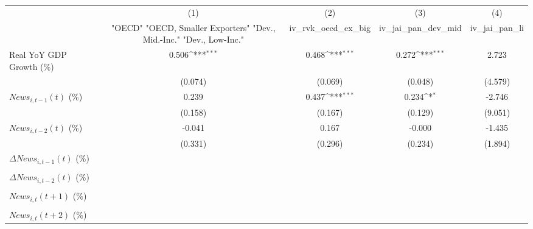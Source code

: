 {
\def\sym#1{\ifmmode^{#1}\else\(^{#1}\)\fi}
\begin{tabular}{l*{4}{c}}
\toprule
                    &\multicolumn{1}{c}{(1)}&\multicolumn{1}{c}{(2)}&\multicolumn{1}{c}{(3)}&\multicolumn{1}{c}{(4)}\\
                    &\multicolumn{1}{c}{ "OECD" "OECD, Smaller Exporters" "Dev., Mid.-Inc." "Dev., Low-Inc."}&\multicolumn{1}{c}{iv_rvk_oecd_ex_big}&\multicolumn{1}{c}{iv_jai_pan_dev_mid}&\multicolumn{1}{c}{iv_jai_pan_li}\\
\midrule
Real YoY GDP Growth (\%)&       0.506\sym{***}&       0.468\sym{***}&       0.272\sym{***}&       2.723         \\
                    &     (0.074)         &     (0.069)         &     (0.048)         &     (4.579)         \\
\addlinespace
$ News_{i,t-1}(t)$ (\%)&       0.239         &       0.437\sym{***}&       0.234\sym{*}  &      -2.746         \\
                    &     (0.158)         &     (0.167)         &     (0.129)         &     (9.051)         \\
\addlinespace
$ News_{i,t-2}(t)$ (\%)&      -0.041         &       0.167         &      -0.000         &      -1.435         \\
                    &     (0.331)         &     (0.296)         &     (0.234)         &     (1.894)         \\
\addlinespace
$ \Delta News_{i,t-1}(t)$ (\%)&                     &                     &                     &                     \\
                    &                     &                     &                     &                     \\
\addlinespace
$ \Delta News_{i,t-2}(t)$ (\%)&                     &                     &                     &                     \\
                    &                     &                     &                     &                     \\
\addlinespace
$ News_{i,t}(t+1)$ (\%)&                     &                     &                     &                     \\
                    &                     &                     &                     &                     \\
\addlinespace
$ News_{i,t}(t+2)$ (\%)&                     &                     &                     &                     \\

\end{tabular}}
